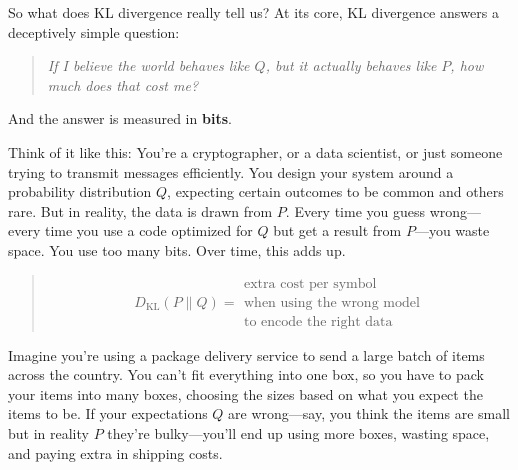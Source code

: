 \vspace{1em}


So what does KL divergence really tell us? At its core, KL divergence answers a deceptively simple question:

\begin{quote}
\emph{If I believe the world behaves like \( Q \), but it actually behaves like \( P \), how much does that cost me?}
\end{quote}

And the answer is measured in \textbf{bits}.

Think of it like this:  You’re a cryptographer, or a data scientist, or just someone trying to transmit messages efficiently. You design your system around a probability distribution \( Q \), expecting certain outcomes to be common and others rare. But in reality, the data is drawn from \( P \). Every time you guess wrong—every time you use a code optimized for \( Q \) but get a result from \( P \)—you waste space. You use too many bits. Over time, this adds up.

\begin{quote}
\[
D_{\mathrm{KL}}(P \parallel Q) =
\begin{array}{l}
\text{extra cost per symbol} \\
\text{when using the wrong model} \\
\text{to encode the right data}
\end{array}
\]
\end{quote}

Imagine you're using a package delivery service to send a large batch of items across the country. You can’t fit everything into one box, so you have to pack your items into many boxes, choosing the sizes based on what you expect the items to be. If your expectations \( Q \) are wrong—say, you think the items are small but in reality \( P \) they’re bulky—you’ll end up using more boxes, wasting space, and paying extra in shipping costs. 


\vspace{1em}

